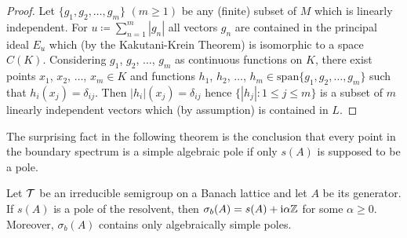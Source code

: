 \begin{proof}
    Let $\{g_{1},g_{2},\ldots,g_{m}\}$ $(m\geq 1)$ be any (finite) subset of\/ $M$ which is linearly independent.
    For $u \coloneq \sum_{n=1}^{m}|g_{n}|$ all vectors $g_{n}$ are contained in the principal ideal $E_{u}$ which (by the Kakutani-Krein Theorem) is isomorphic to a space $C(K)$.
    Considering $g_{1}$, $g_{2}$, $\ldots$, $g_{m}$ as continuous functions on $K$, there exist points $x_{1}$, $x_{2}$, $\ldots$, $x_{m} \in K$ and functions $h_{1}$, $h_{2}$, $\ldots$, $h_{m} \in \mathrm{span}\{g_{1},g_{2},\ldots,g_{m}\}$ such that $h_{i}(x_{j}) = \delta_{ij}$.
    Then $|h_{i}|(x_{j}) = \delta_{ij}$ hence $\{|h_{j}| \colon 1\leq j\leq m\}$
    is a subset of\/ $m$ linearly independent vectors which (by assumption) is contained in $L$.
\end{proof}
The surprising fact in the following theorem is the conclusion that every point in the boundary spectrum is a simple algebraic pole 
if only $s(A)$ is supposed to be a pole.

\begin{theorem}\label{thm:c3-3.12}

Let $\mathcal{T}$ be an irreducible semigroup on a Banach lattice and let $A$ be its generator.
If\/ $s(A)$ is a pole of the resolvent, then $\sigma_{b}(A) = s(A) + \mathrm{i}\alpha\mathbb{Z}$ for some $\alpha \geq 0$.
Moreover, $\sigma_{b}(A)$ contains only algebraically simple poles.
\end{theorem}

